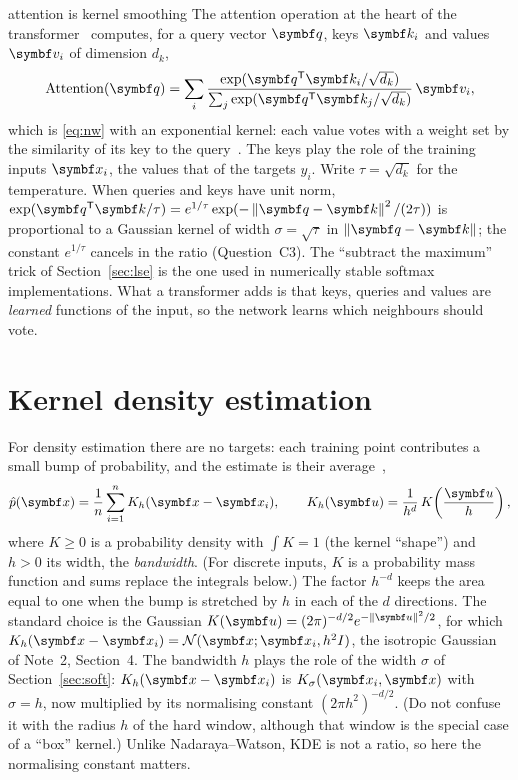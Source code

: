 \documentclass[11pt]{article}
\begin{document}
\begin{modern}{attention is kernel smoothing}
The attention operation at the heart of the transformer~\cite{vaswani2017} computes, for a query vector $\vect{q}$,
keys $\vect{k}_i$ and values $\vect{v}_i$ of dimension $d_k$,
\[
  \mathrm{Attention}(\vect{q}) = \sum_i \frac{\exp(\vect{q}\T\vect{k}_i / \sqrt{d_k})}{\sum_j \exp(\vect{q}\T\vect{k}_j / \sqrt{d_k})}\, \vect{v}_i ,
\]
which is \eqref{eq:nw} with an exponential kernel: each value votes with a weight set by the similarity of its key to
the query~\cite{tsai2019}. The keys play the role of the training inputs $\x_i$, the values that of the targets $y_i$.
Write $\tau = \sqrt{d_k}$ for the temperature. When queries and keys have unit norm,
$\exp(\vect{q}\T\vect{k}/\tau) = e^{1/\tau} \exp(-\norm{\vect{q} - \vect{k}}^2/(2\tau))$ is proportional to a Gaussian
kernel of width $\sigma = \sqrt{\tau}$ in $\norm{\vect{q} - \vect{k}}$; the constant $e^{1/\tau}$ cancels in the ratio
(Question~C3). The ``subtract the maximum'' trick of Section~\ref{sec:lse} is the one used in numerically
stable softmax implementations. What a transformer adds is that keys, queries and values are \emph{learned}
functions of the input, so the network learns which neighbours should vote.
\end{modern}

\section{Kernel density estimation}\label{sec:kde}

For density estimation there are no targets: each training point contributes a small bump of probability, and the
estimate is their average~\cite{rosenblatt1956,parzen1962},
\begin{equation}\label{eq:kde}
  \hat p(\x) = \frac{1}{n}\sum_{i=1}^n K_h(\x - \x_i), \qquad K_h(\vect{u}) = \frac{1}{h^d}\, K\!\left(\frac{\vect{u}}{h}\right),
\end{equation}
where $K \ge 0$ is a probability density with $\int K = 1$ (the kernel ``shape'') and $h > 0$ its width, the
\emph{bandwidth}. (For discrete inputs, $K$ is a probability mass function and sums replace the integrals below.) The factor $h^{-d}$ keeps the area equal to one when the bump is stretched by $h$ in each of the $d$
directions. The standard choice is the Gaussian $K(\vect{u}) = (2\pi)^{-d/2} e^{-\norm{\vect{u}}^2/2}$, for which
$K_h(\x - \x_i) = \Normal(\x; \x_i, h^2 I)$, the isotropic Gaussian of Note~2, Section~4. The bandwidth $h$ plays the
role of the width $\sigma$ of Section~\ref{sec:soft}: $K_h(\x - \x_i)$ is $K_\sigma(\x_i, \x)$ with $\sigma = h$, now
multiplied by its normalising constant $(2\pi h^2)^{-d/2}$. (Do not confuse it with the radius $h$ of the hard window,
although that window is the special case of a ``box'' kernel.) Unlike Nadaraya--Watson, KDE is not a ratio, so here
the normalising constant matters.
\end{document}
